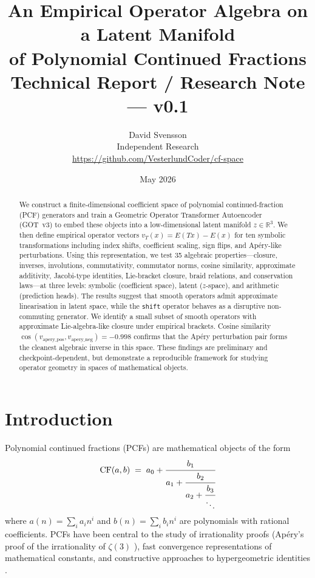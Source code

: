 \documentclass[11pt,a4paper]{article}
\title{\textbf{An Empirical Operator Algebra on a Latent Manifold\\
       of Polynomial Continued Fractions}\\[0.4em]
       {\large Technical Report / Research Note --- v0.1}}
\author{David Svensson\\
        \small Independent Research\\
        \small \url{https://github.com/VesterlundCoder/cf-space}}
\date{May 2026}
\begin{document}
\maketitle

\begin{abstract}
We construct a finite-dimensional coefficient space of polynomial
continued-fraction (PCF) generators and train a Geometric Operator
Transformer Autoencoder (GOT~v3) to embed these objects into a
low-dimensional latent manifold $z \in \mathbb{R}^3$.  We then define
empirical operator vectors $v_T(x) = E(Tx) - E(x)$ for ten symbolic
transformations including index shifts, coefficient scaling, sign flips,
and Ap\'ery-like perturbations.  Using this representation, we test 35
algebraic properties---closure, inverses, involutions, commutativity,
commutator norms, cosine similarity, approximate additivity, Jacobi-type
identities, Lie-bracket closure, braid relations, and conservation
laws---at three levels: symbolic (coefficient space), latent ($z$-space),
and arithmetic (prediction heads).  The results suggest that smooth
operators admit approximate linearisation in latent space, while the
\texttt{shift} operator behaves as a disruptive non-commuting generator.
We identify a small subset of smooth operators with approximate
Lie-algebra-like closure under empirical brackets.  Cosine similarity
$\cos(v_{\mathrm{apery\_pos}}, v_{\mathrm{apery\_neg}}) = -0.998$ confirms
that the Ap\'ery perturbation pair forms the cleanest algebraic inverse in
this space.  These findings are preliminary and checkpoint-dependent, but
demonstrate a reproducible framework for studying operator geometry in
spaces of mathematical objects.
\end{abstract}

\tableofcontents
\bigskip

\section{Introduction}

Polynomial continued fractions (PCFs) are mathematical objects of the form
\begin{equation}
  \mathrm{CF}(a, b) \;=\;
  a_0 + \cfrac{b_1}{a_1 + \cfrac{b_2}{a_2 + \cfrac{b_3}{\ddots}}}
\end{equation}
where $a(n) = \sum_{i} a_i n^i$ and $b(n) = \sum_{i} b_i n^i$ are polynomials
with rational coefficients.  PCFs have been central to the study of
irrationality proofs (Ap\'ery's proof of the irrationality of $\zeta(3)$
\cite{apery1979}), fast convergence representations of mathematical constants,
and constructive approaches to hypergeometric identities
\cite{gauss1812hypergeometric}.
\end{document}
